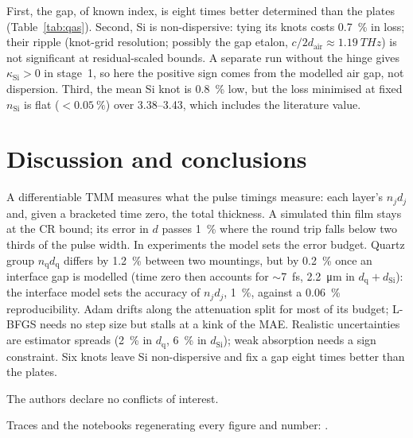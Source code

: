 \documentclass{optica-article}
\newcommand{\kap}{\kappa}
\newcommand{\nq}{n_{\mathrm q}}\newcommand{\kq}{\kap_{\mathrm q}}\newcommand{\dq}{d_{\mathrm q}}
\newcommand{\nS}{n_{\mathrm{Si}}}\newcommand{\kS}{\kap_{\mathrm{Si}}}\newcommand{\dS}{d_{\mathrm{Si}}}
\begin{document}
First, the gap, of known index, is eight times better determined than the plates (Table~\ref{tab:qas}). Second, Si is non-dispersive: tying its knots costs \SI{0.7}{\percent} in loss; their ripple (knot-grid resolution; possibly the gap etalon, $c/2d_{\mathrm{air}}\approx\SI{1.19}{THz}$) is not significant at residual-scaled bounds. A separate run without the hinge gives $\kS>0$ in stage~1, so here the positive sign comes from the modelled air gap, not dispersion. Third, the mean Si knot is \SI{0.8}{\percent} low, but the loss minimised at fixed $\nS$ is flat ($<\SI{0.05}{\percent}$) over 3.38--3.43, which includes the literature value.

\section{Discussion and conclusions}\label{sec:conclusions}
A differentiable TMM measures what the pulse timings measure: each layer's $n_jd_j$ and, given a bracketed time zero, the total thickness. A simulated thin film stays at the CR bound; its error in $d$ passes \SI{1}{\percent} where the round trip falls below two thirds of the pulse width. In experiments the model sets the error budget. Quartz group $\nq\dq$ differs by \SI{1.2}{\percent} between two mountings, but by \SI{0.2}{\percent} once an interface gap is modelled (time zero then accounts for $\sim$\SI{7}{\femto\second}, \SI{2.2}{\micro\metre} in $\dq+\dS$): the interface model sets the accuracy of $n_jd_j$, \SI{1}{\percent}, against a \SI{0.06}{\percent} reproducibility. Adam drifts along the attenuation split for most of its budget; L-BFGS needs no step size but stalls at a kink of the MAE. Realistic uncertainties are estimator spreads (\SI{2}{\percent} in $\dq$, \SI{6}{\percent} in $\dS$); weak absorption needs a sign constraint. Six knots leave Si non-dispersive and fix a gap eight times better than the plates.

\begin{backmatter}
 \todo{[to be added]}

 \todo{[to be added]}

 The authors declare no conflicts of interest. 

 Traces and the notebooks regenerating every figure and number: .
\end{backmatter}


\end{document}
